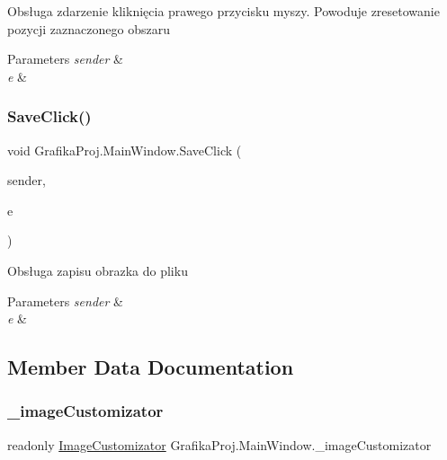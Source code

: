 Obsługa zdarzenie kliknięcia prawego przycisku myszy. Powoduje zresetowanie pozycji zaznaczonego obszaru 


\begin{DoxyParams}{Parameters}
{\em sender} & \\
\hline
{\em e} & \\
\hline
\end{DoxyParams}
\mbox{\label{class_grafika_proj_1_1_main_window_a204574e641ee3b1b06fcfbb3be4aca90}} 
\subsubsection{\texorpdfstring{SaveClick()}{SaveClick()}}
{\footnotesize\ttfamily void Grafika\+Proj.\+Main\+Window.\+Save\+Click (\begin{DoxyParamCaption}\item[{object}]{sender,  }\item[{System.\+Event\+Args}]{e }\end{DoxyParamCaption})\hspace{0.3cm}{\ttfamily [private]}}



Obsługa zapisu obrazka do pliku 


\begin{DoxyParams}{Parameters}
{\em sender} & \\
\hline
{\em e} & \\
\hline
\end{DoxyParams}


\subsection{Member Data Documentation}
\mbox{\label{class_grafika_proj_1_1_main_window_a82253cbf931b7474d0612bbb8406612a}} 
\subsubsection{\texorpdfstring{\_imageCustomizator}{\_imageCustomizator}}
{\footnotesize\ttfamily readonly \mbox{\hyperlink{class_grafika_proj_1_1_image_customizator}{Image\+Customizator}} Grafika\+Proj.\+Main\+Window.\+\_\+image\+Customizator\hspace{0.3cm}{\ttfamily [private]}}

